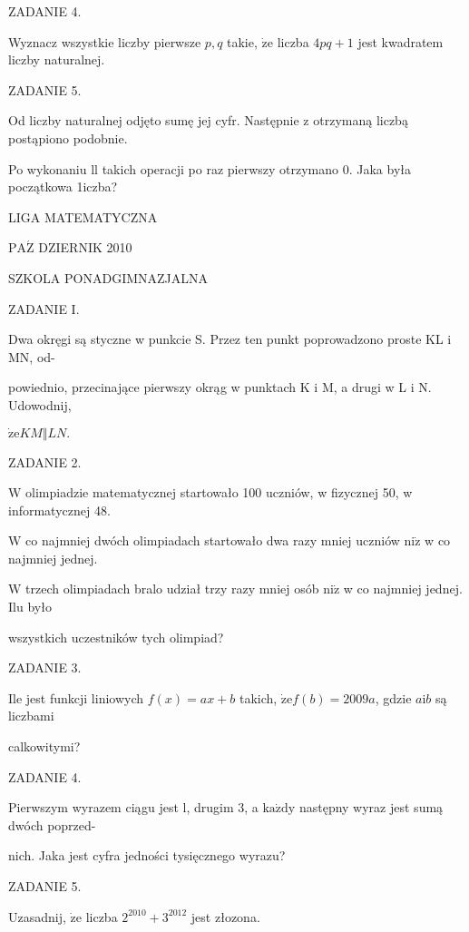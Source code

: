 \documentclass[a4paper,12pt]{article}
\begin{document}
ZADANIE 4.

Wyznacz wszystkie liczby pierwsze $p, q$ takie, $\dot{\mathrm{z}}\mathrm{e}$ liczba $4pq+1$ jest kwadratem liczby naturalnej.

ZADANIE 5.

Od liczby naturalnej odjęto sumę jej cyfr. Następnie z otrzymaną liczbą postąpiono podobnie.

Po wykonaniu ll takich operacji po raz pierwszy otrzymano 0. Jaka była początkowa 1iczba?






LIGA MATEMATYCZNA

$\mathrm{P}\mathrm{A}\acute{\mathrm{Z}}$ DZIERNIK 2010

SZKOLA PONADGIMNAZJALNA

ZADANIE I.

Dwa okręgi są styczne w punkcie S. Przez ten punkt poprowadzono proste KL i MN, od-

powiednio, przecinające pierwszy okrąg w punktach K i M, a drugi w L i N. Udowodnij,

$\dot{\mathrm{z}}\mathrm{e}KM\Vert LN.$

ZADANIE 2.

$\mathrm{W}$ olimpiadzie matematycznej startowało 100 uczniów, w fizycznej 50, w informatycznej 48.

$\mathrm{W}$ co najmniej dwóch olimpiadach startowało dwa razy mniej uczniów $\mathrm{n}\mathrm{i}\dot{\mathrm{z}}$ w co najmniej jednej.

$\mathrm{W}$ trzech olimpiadach bralo udział trzy razy mniej osób $\mathrm{n}\mathrm{i}\dot{\mathrm{z}}$ w co najmniej jednej. Ilu było

wszystkich uczestników tych olimpiad?

ZADANIE 3.

Ile jest funkcji liniowych $f(x) = ax+b$ takich, $\dot{\mathrm{z}}\mathrm{e} f(b) = 2009a$, gdzie $a \mathrm{i} b$ są liczbami

calkowitymi?

ZADANIE 4.

Pierwszym wyrazem ciągu jest l, drugim 3, a $\mathrm{k}\mathrm{a}\dot{\mathrm{z}}\mathrm{d}\mathrm{y}$ następny wyraz jest sumą dwóch poprzed-

nich. Jaka jest cyfra jedności tysięcznego wyrazu?

ZADANIE 5.

Uzasadnij, $\dot{\mathrm{z}}\mathrm{e}$ liczba $2^{2010}+3^{2012}$ jest złozona.
\end{document}
